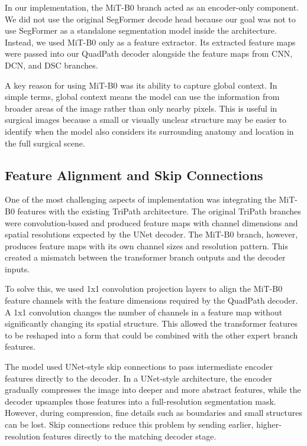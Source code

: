 \documentclass[twocolumn]{article}
\begin{document}
In our implementation, the MiT-B0 branch acted as an encoder-only component. We did not use the original SegFormer decode head because our goal was not to use SegFormer as a standalone segmentation model inside the architecture. Instead, we used MiT-B0 only as a feature extractor. Its extracted feature maps were passed into our QuadPath decoder alongside the feature maps from CNN, DCN, and DSC branches.

A key reason for using MiT-B0 was its ability to capture global context. In simple terms, global context means the model can use the information from broader areas of the image rather than only nearby pixels. This is useful in surgical images because a small or visually unclear structure may be easier to identify when the model also considers its surrounding anatomy and location in the full surgical scene.

\subsection{Feature Alignment and Skip Connections }

One of the most challenging aspects of implementation was integrating the MiT-B0 features with the existing TriPath architecture. The original TriPath branches were convolution-based and produced feature maps with channel dimensions and spatial resolutions expected by the UNet decoder. The MiT-B0 branch, however, produces feature maps with its own channel sizes and resolution pattern. This created a mismatch between the transformer branch outputs and the decoder inputs.

To solve this, we used 1x1 convolution projection layers to align the MiT-B0 feature channels with the feature dimensions required by the QuadPath decoder. A 1x1 convolution changes the number of channels in a feature map without significantly changing its spatial structure. This allowed the transformer features to be reshaped into a form that could be combined with the other expert branch features.

The model used UNet-style skip connections to pass intermediate encoder features directly to the decoder. In a UNet-style architecture, the encoder gradually compresses the image into deeper and more abstract features, while the decoder upsamples those features into a full-resolution segmentation mask. However, during compression, fine details such as boundaries and small structures can be lost. Skip connections reduce this problem by sending earlier, higher-resolution features directly to the matching decoder stage.
\end{document}
